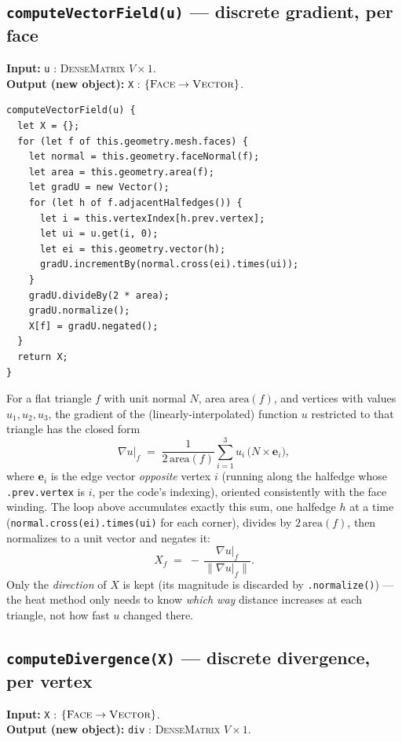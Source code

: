 \documentclass[11pt]{article}
\newcommand{\code}[1]{\texttt{#1}}
\newcommand{\func}[1]{\texttt{\textbf{#1}}}
\newcommand{\type}[1]{\textsc{#1}}
\begin{document}
\subsection{\func{computeVectorField(u)} --- discrete gradient, per face}
\label{sec:vectorfield}
\textbf{Input:} \code{u} : \type{DenseMatrix} $V\times1$.\\
\textbf{Output (new object):} \code{X} : $\{\type{Face}\to\type{Vector}\}$.

\begin{lstlisting}
computeVectorField(u) {
  let X = {};
  for (let f of this.geometry.mesh.faces) {
    let normal = this.geometry.faceNormal(f);
    let area = this.geometry.area(f);
    let gradU = new Vector();
    for (let h of f.adjacentHalfedges()) {
      let i = this.vertexIndex[h.prev.vertex];
      let ui = u.get(i, 0);
      let ei = this.geometry.vector(h);
      gradU.incrementBy(normal.cross(ei).times(ui));
    }
    gradU.divideBy(2 * area);
    gradU.normalize();
    X[f] = gradU.negated();
  }
  return X;
}
\end{lstlisting}

For a flat triangle $f$ with unit normal $N$, area $\mathrm{area}(f)$, and vertices with
values $u_1,u_2,u_3$, the gradient of the (linearly-interpolated) function $u$ restricted to
that triangle has the closed form
\[
  \nabla u\big|_f \;=\; \frac{1}{2\,\mathrm{area}(f)}\sum_{i=1}^{3} u_i \,\big(N \times \mathbf{e}_i\big),
\]
where $\mathbf{e}_i$ is the edge vector \emph{opposite} vertex $i$ (running along the
halfedge whose \code{.prev.vertex} is $i$, per the code's indexing), oriented consistently
with the face winding. The loop above accumulates exactly this sum, one halfedge $h$ at a
time (\code{normal.cross(ei).times(ui)} for each corner), divides by $2\,\mathrm{area}(f)$,
then normalizes to a unit vector and negates it:
\[
  X_f \;=\; -\,\frac{\nabla u|_f}{\lVert \nabla u|_f\rVert}.
\]
Only the \emph{direction} of $X$ is kept (its magnitude is discarded by
\code{.normalize()}) --- the heat method only needs to know \emph{which way} distance
increases at each triangle, not how fast $u$ changed there.

\subsection{\func{computeDivergence(X)} --- discrete divergence, per vertex}
\label{sec:divergence}
\textbf{Input:} \code{X} : $\{\type{Face}\to\type{Vector}\}$.\\
\textbf{Output (new object):} \code{div} : \type{DenseMatrix} $V\times1$.
\end{document}
